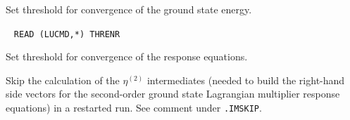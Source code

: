 \begin{description}
       Set threshold for convergence of the ground state energy.
 
\item[\Key{THRLEQ}] \verb| |\newline
       \verb|READ (LUCMD,*) THRENR|

       Set threshold for convergence of the response equations.
 
%
%
\item[\Key{X2SKIP}] 
   Skip the calculation of the $\eta^{(2)}$ intermediates (needed
   to build the right-hand side vectors for the second-order 
   ground state Lagrangian multiplier response equations) 
   in a restarted run. See comment under \verb|.IMSKIP|.
%
\end{description}

